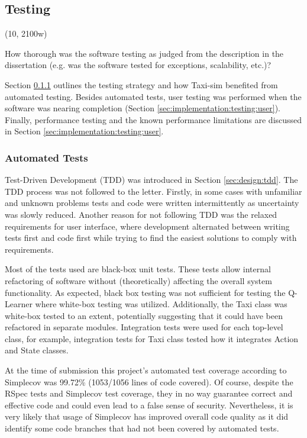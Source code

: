 \subsection{Testing}
\label{sec:implementation:testing}

(10, 2100w)

How thorough was the software testing as judged from the description in the
dissertation (e.g. was the software tested for exceptions, scalability, etc.)?

Section \ref{sec:implementation:testing:automated} outlines the testing
strategy and how Taxi-sim benefited from automated testing. Besides automated
tests, user testing was performed when the software was nearing completion
(Section \ref{sec:implementation:testing:user}). Finally, performance testing
and the known performance limitations are discussed in Section
\ref{sec:implementation:testing:user}.

\subsubsection{Automated Tests}
\label{sec:implementation:testing:automated}

Test-Driven Development (TDD) was introduced in Section \ref{sec:design:tdd}.
The TDD process was not followed to the letter. Firstly, in some cases with
unfamiliar and unknown problems tests and code were written intermittently as
uncertainty was slowly reduced. Another reason for not following TDD was the
relaxed requirements for user interface, where development alternated between
writing tests first and code first while trying to find the easiest solutions
to comply with requirements.

Most of the tests used are black-box unit tests. These tests allow internal
refactoring of software without (theoretically) affecting the overall system
functionality. As expected, black box testing was not sufficient for testing
the Q-Learner where white-box testing was utilized. Additionally, the Taxi
class was white-box tested to an extent, potentially suggesting that it could
have been refactored in separate modules. Integration tests were used for each
top-level class, for example, integration tests for Taxi class tested how it
integrates Action and State classes.

At the time of submission this project's automated test coverage according to
Simplecov was 99.72\% (1053/1056 lines of code covered). Of course, despite the
RSpec tests and Simplecov test coverage, they in no way guarantee correct and
effective code and could even lead to a false sense of security. Nevertheless,
it is very likely that usage of Simplecov has improved overall code quality as
it did identify some code branches that had not been covered by automated
tests.


